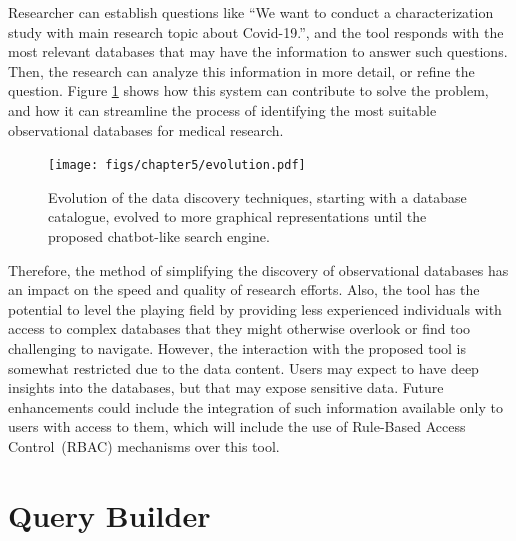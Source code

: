 Researcher can establish questions like ``We want to conduct a characterization study with main research topic about Covid-19.'', and the tool responds with the most relevant databases that may have the information to answer such questions. Then, the research can analyze this information in more detail, or refine the question. Figure \ref{fig_chat1} shows how this system can contribute to solve the problem, and how it can streamline the process of identifying the most suitable observational databases for medical research.

\begin{figure}[H]
    \texttt{[image: figs/chapter5/evolution.pdf]}
    \centering
	\caption{Evolution of the data discovery techniques, starting with a database catalogue, evolved to more graphical representations until the proposed chatbot-like search engine.}
    \label{fig_chat1}
\end{figure}


Therefore, the method of simplifying the discovery of observational databases has an impact on the speed and quality of research efforts. Also, the tool has the potential to level the playing field by providing less experienced individuals with access to complex databases that they might otherwise overlook or find too challenging to navigate. However, the interaction with the proposed tool is somewhat restricted due to the data content. Users may expect to have deep insights into the databases, but that may expose sensitive data. Future enhancements could include the integration of such information available only to users with access to them, which will include the use of Rule-Based Access Control~(RBAC) mechanisms over this tool.



\section{Query Builder}



